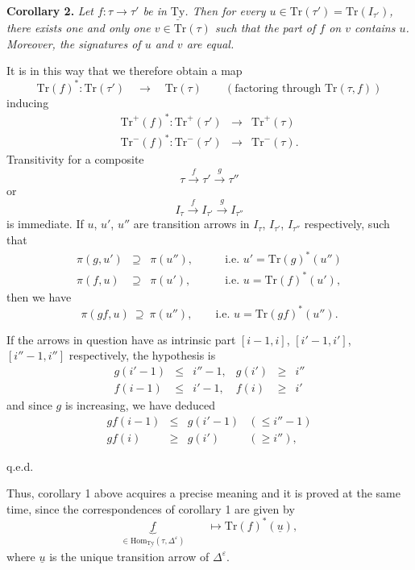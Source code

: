 \documentclass[11pt]{article}
\newcommand{\printedpage}[1]{\marginpar{\footnotesize p.~#1}}
\newcommand{\msp}[1]{\marginpar{\footnotesize [#1]}}
\newcommand{\Tr}{\mathrm{Tr}}
\newcommand{\Hom}{\mathrm{Hom}}
\newcommand{\uTy}{\underline{\mathrm{Ty}}}
\begin{document}
\textbf{Corollary 2.} \textit{Let $f : \tau \longrightarrow \tau'$ be in $\uTy$. Then for every $u \in \Tr(\tau') = \Tr(I_{\tau'})$, there exists one and only one $v \in \Tr(\tau)$ such that the part of $f$ on $v$ contains $u$. Moreover, the signatures of $u$ and $v$ are equal.}

It is in this way that we therefore obtain a map
\[
\Tr(f)^* : \Tr(\tau') \quad \longrightarrow \quad \Tr(\tau) \qquad (\text{factoring through } \Tr(\tau, f))
\]
inducing
\[
\begin{array}{rcl}
\Tr^+(f)^* : \Tr^+(\tau') & \longrightarrow & \Tr^+(\tau) \\
\Tr^-(f)^* : \Tr^-(\tau') & \longrightarrow & \Tr^-(\tau).
\end{array}
\]
Transitivity for a composite
\[
\tau \xrightarrow{f} \tau' \xrightarrow{g} \tau''
\]
or
\[
I_\tau \xrightarrow{f} I_{\tau'} \xrightarrow{g} I_{\tau''}
\]
is immediate. If $u$, $u'$, $u''$ are transition arrows in $I_\tau$, $I_{\tau'}$, $I_{\tau''}$ respectively, such that
\[
\begin{array}{rcll}
\pi(g, u') & \supseteq & \pi(u''), & \qquad \text{i.e. } u' = \Tr(g)^*(u'') \\
\pi(f, u) & \supseteq & \pi(u'), & \qquad \text{i.e. } u = \Tr(f)^*(u'),
\end{array}
\]
then we have
\[
\pi(gf, u) \ \supseteq\ \pi(u''), \qquad \text{i.e. } u = \Tr(gf)^*(u'').
\]

\msp{page 43}
If the arrows in question have as intrinsic part $[i-1, i]$, $[i'-1, i']$, $[i''-1, i'']$ respectively, the hypothesis is
\[
\begin{array}{rclrcl}
g(i'-1) & \leq & i''-1, & g(i') & \geq & i'' \\
f(i-1) & \leq & i'-1, & f(i) & \geq & i'
\end{array}
\]
and since $g$ is increasing, we have deduced
\[
\begin{array}{rcll}
gf(i-1) & \leq & g(i'-1) & (\leq i''-1) \\
gf(i) & \geq & g(i') & (\geq i''),
\end{array}
\]
\begin{flushright}
q.e.d.
\end{flushright}

\printedpage{28}

Thus, corollary 1 above acquires a precise meaning and it is proved at the same time, since the correspondences of corollary 1 are given by
\[
\underbrace{f}_{\in \Hom_{\uTy}(\tau, \Delta^{\varepsilon})} \qquad \longmapsto \Tr(f)^*(\underline{u}),
\]
where $\underline{u}$ is the unique transition arrow of $\Delta^{\varepsilon}$.
\end{document}
